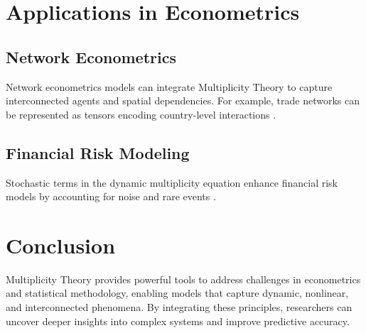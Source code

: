 \documentclass{article}
\theoremstyle{plain}
\begin{document}
\section{Applications in Econometrics}

\subsection{Network Econometrics}
Network econometrics models can integrate Multiplicity Theory to capture interconnected agents and spatial dependencies. For example, trade networks can be represented as tensors encoding country-level interactions \cite{barabasi2016network}.

\subsection{Financial Risk Modeling}
Stochastic terms in the dynamic multiplicity equation enhance financial risk models by accounting for noise and rare events \cite{box1970time, kahneman1979prospect}.

\section{Conclusion}
Multiplicity Theory provides powerful tools to address challenges in econometrics and statistical methodology, enabling models that capture dynamic, nonlinear, and interconnected phenomena. By integrating these principles, researchers can uncover deeper insights into complex systems and improve predictive accuracy.

\nocite{*}


\end{document}
